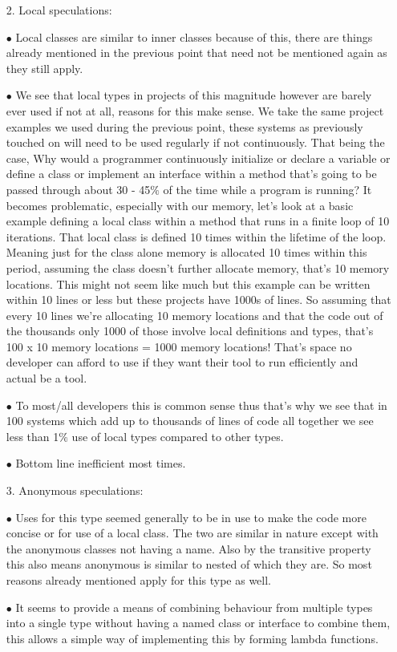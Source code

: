 \documentclass{assignment}
\begin{document}
\begin{enumerate}
\item[2.]Local speculations:
\item[$\bullet$]Local classes are similar to inner classes because of this, there are things already mentioned in the previous point that need not be mentioned again as they still apply.
\item[$\bullet$]We see that local types in projects of this magnitude however are barely ever used if not at all, reasons for this make sense. We take the same project examples we used during the previous point, these systems as previously touched on will need to be used regularly if not continuously. That being the case, Why would a programmer continuously initialize or declare a variable or define a class or implement an interface within a method that’s going to be passed through about 30 - 45$\%$ of the time while a program is running? It becomes problematic, especially with our memory,  let’s look at a basic example defining a local class within a method that runs in a finite loop of 10 iterations. That local class is defined 10 times within the lifetime of the loop. Meaning just for the class alone memory is allocated 10 times within this period, assuming the class doesn’t further allocate memory, that’s 10 memory locations. This might not seem like much but this example can be written within 10 lines or less but these projects have 1000s of lines. So assuming that every 10 lines we’re allocating 10 memory locations and that the code out of the thousands only 1000 of those involve local definitions and types, that’s 100 x 10 memory locations = 1000 memory locations! That’s space no developer can afford to use if they want their tool to run efficiently and actual be a tool.
\item[$\bullet$]To most/all developers this is common sense thus that’s why we see that in 100 systems which add up to thousands of lines of code all together we see less than 1$\%$ use of local types compared to other types.
\item[$\bullet$]Bottom line inefficient most times.

\item[3.]Anonymous speculations:
\item[$\bullet$]Uses for this type seemed generally to be in use to make the code more concise or for use of a local class. The two are similar in nature except with the anonymous classes not having a name. Also by the transitive property this also means anonymous is similar to nested of which they are. So most reasons already mentioned apply for this type as well.
\item[$\bullet$]It seems to provide a means of combining behaviour from multiple types into a single type without having a named class or interface to combine them, this allows a simple way of implementing this by forming lambda functions.\\
\end{enumerate}
\end{document}
